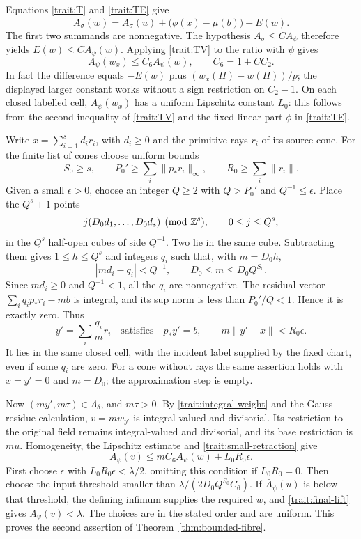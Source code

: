 Equations \eqref{trait:T} and \eqref{trait:TE} give
\[
 A_\sigma(w)=\bar A_\sigma(u)
             +\bigl(\phi(x)-\mu(b)\bigr)+E(w).
\]
The first two summands are nonnegative.  The
hypothesis \(A_\sigma\le C A_\psi\) therefore yields
\(E(w)\le C A_\psi(w)\).  Applying
\eqref{trait:TV} to the ratio with \(\psi\) gives
\begin{equation}
 A_\psi(w_x)\le C_6 A_\psi(w),\qquad C_6=1+CC_2.
 \label{trait:small-retraction}
\end{equation}
In fact the difference equals \(-E(w)\) plus
\((w_x(H)-w(H))/p\); the displayed larger constant
works without a sign restriction on \(C_2-1\).
On each closed labelled cell, \(A_\psi(w_x)\) has
a uniform Lipschitz constant \(L_0\): this follows
from the second inequality of \eqref{trait:TV} and
the fixed linear part \(\phi\) in \eqref{trait:TE}.

Write \(x=\sum_{i=1}^s d_i r_i\), with
\(d_i\ge0\) and the primitive rays \(r_i\) of its
source cone.  For the finite list of cones choose
uniform bounds
\[
 S_0\ge s,\qquad
 P_0'\ge\sum_i\|p_*r_i\|_\infty,\qquad
 R_0\ge\sum_i\|r_i\|.
\]
Given a small \(\epsilon>0\), choose an integer
\(Q\ge2\) with \(Q>P_0'\) and \(Q^{-1}\le\epsilon\).
Place the \(Q^s+1\) points
\[
 j(D_0d_1,\ldots,D_0d_s)\pmod{\mathbb Z^s},
 \qquad 0\le j\le Q^s,
\]
in the \(Q^s\) half-open cubes of side \(Q^{-1}\).
Two lie in the same cube.  Subtracting them gives
\(1\le h\le Q^s\) and integers \(q_i\) such that,
with \(m=D_0h\),
\begin{equation}
 |md_i-q_i|<Q^{-1},\qquad
 D_0\le m\le D_0Q^{S_0}.
 \label{trait:dirichlet}
\end{equation}
Since \(md_i\ge0\) and \(Q^{-1}<1\), all the
\(q_i\) are nonnegative.  The residual vector
\(\sum_iq_ip_*r_i-mb\) is integral, and its sup
norm is less than \(P_0'/Q<1\).  Hence it is
exactly zero.  Thus
\[
 y'=\sum_i\frac{q_i}{m}r_i
 \quad\text{satisfies}\quad
 p_*y'=b,\qquad
 m\|y'-x\|<R_0\epsilon.
\]
It lies in the same closed cell, with the incident
label supplied by the fixed chart, even if some
\(q_i\) are zero.  For a cone without rays the
same assertion holds with \(x=y'=0\) and
\(m=D_0\); the approximation step is empty.

Now \((my',m\tau)\in\Lambda_\delta\), and
\(m\tau>0\).  By \eqref{trait:integral-weight}
and the Gauss residue calculation,
\(v=mw_{y'}\) is integral-valued and divisorial.
Its restriction to the original field remains
integral-valued and divisorial, and its base
restriction is \(mu\).  Homogeneity, the
Lipschitz estimate and \eqref{trait:small-retraction}
give
\begin{equation}
 A_\psi(v)\le mC_6 A_\psi(w)+L_0R_0\epsilon.
 \label{trait:final-lift}
\end{equation}
First choose \(\epsilon\) with
\(L_0R_0\epsilon<\lambda/2\), omitting this
condition if \(L_0R_0=0\).  Then choose the input
threshold smaller than
\(\lambda/(2D_0Q^{S_0}C_6)\).  If
\(\bar A_\psi(u)\) is below that threshold,
the defining infimum supplies the required
\(w\), and \eqref{trait:final-lift} gives
\(A_\psi(v)<\lambda\).  The choices are in the
stated order and are uniform.  This proves the
second assertion of Theorem~\ref{thm:bounded-fibre}.
